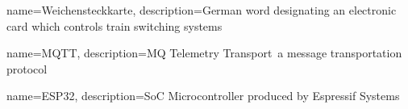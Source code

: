 {
    name=Weichensteckkarte,
    description=German word designating an electronic card which controls train switching systems
}

{
    name=MQTT,
    description=MQ Telemetry Transport\, a message transportation protocol
}

{
    name=ESP32,
    description=SoC Microcontroller produced by Espressif Systems
}

